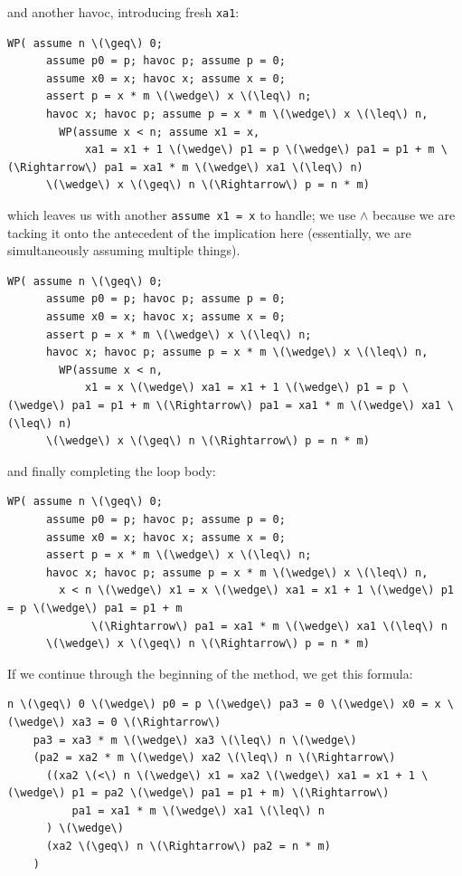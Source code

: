\documentclass[11pt]{article}
\begin{document}
\newpage
and another \textsf{havoc}, introducing fresh \texttt{xa1}:
\begin{Verbatim}[commandchars=\\\{\}]
  WP( assume n \(\geq\) 0;
      assume p0 = p; havoc p; assume p = 0; 
      assume x0 = x; havoc x; assume x = 0; 
      assert p = x * m \(\wedge\) x \(\leq\) n;
      havoc x; havoc p; assume p = x * m \(\wedge\) x \(\leq\) n,
        WP(assume x < n; assume x1 = x,
            xa1 = x1 + 1 \(\wedge\) p1 = p \(\wedge\) pa1 = p1 + m \(\Rightarrow\) pa1 = xa1 * m \(\wedge\) xa1 \(\leq\) n)
      \(\wedge\) x \(\geq\) n \(\Rightarrow\) p = n * m)
\end{Verbatim}
which leaves us with another \texttt{assume x1 = x} to handle; we use $\wedge$ because we are tacking it onto the antecedent of the implication here (essentially, we are simultaneously assuming multiple things).
\begin{Verbatim}[commandchars=\\\{\}]
  WP( assume n \(\geq\) 0;
      assume p0 = p; havoc p; assume p = 0; 
      assume x0 = x; havoc x; assume x = 0; 
      assert p = x * m \(\wedge\) x \(\leq\) n;
      havoc x; havoc p; assume p = x * m \(\wedge\) x \(\leq\) n,
        WP(assume x < n,  
            x1 = x \(\wedge\) xa1 = x1 + 1 \(\wedge\) p1 = p \(\wedge\) pa1 = p1 + m \(\Rightarrow\) pa1 = xa1 * m \(\wedge\) xa1 \(\leq\) n)
      \(\wedge\) x \(\geq\) n \(\Rightarrow\) p = n * m)
\end{Verbatim}
and finally completing the loop body:
\begin{Verbatim}[commandchars=\\\{\}]
  WP( assume n \(\geq\) 0;
      assume p0 = p; havoc p; assume p = 0; 
      assume x0 = x; havoc x; assume x = 0; 
      assert p = x * m \(\wedge\) x \(\leq\) n;
      havoc x; havoc p; assume p = x * m \(\wedge\) x \(\leq\) n,
        x < n \(\wedge\) x1 = x \(\wedge\) xa1 = x1 + 1 \(\wedge\) p1 = p \(\wedge\) pa1 = p1 + m
             \(\Rightarrow\) pa1 = xa1 * m \(\wedge\) xa1 \(\leq\) n
      \(\wedge\) x \(\geq\) n \(\Rightarrow\) p = n * m)
\end{Verbatim}
If we continue through the beginning of the method, we get this formula:
\begin{Verbatim}[commandchars=\\\{\}]
  n \(\geq\) 0 \(\wedge\) p0 = p \(\wedge\) pa3 = 0 \(\wedge\) x0 = x \(\wedge\) xa3 = 0 \(\Rightarrow\)
    pa3 = xa3 * m \(\wedge\) xa3 \(\leq\) n \(\wedge\)
    (pa2 = xa2 * m \(\wedge\) xa2 \(\leq\) n \(\Rightarrow\)
      ((xa2 \(<\) n \(\wedge\) x1 = xa2 \(\wedge\) xa1 = x1 + 1 \(\wedge\) p1 = pa2 \(\wedge\) pa1 = p1 + m) \(\Rightarrow\)
          pa1 = xa1 * m \(\wedge\) xa1 \(\leq\) n
      ) \(\wedge\)
      (xa2 \(\geq\) n \(\Rightarrow\) pa2 = n * m)
    )
\end{Verbatim}
\end{document}
